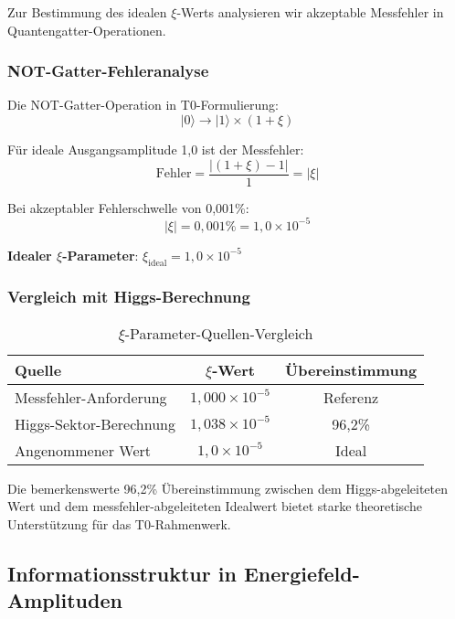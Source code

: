 \documentclass[12pt,a4paper]{article}
\begin{document}
	Zur Bestimmung des idealen $\xi$-Werts analysieren wir akzeptable Messfehler in Quantengatter-Operationen.
	
	\subsubsection{NOT-Gatter-Fehleranalyse}
	
	Die NOT-Gatter-Operation in T0-Formulierung:
	\begin{equation}
		|0\rangle \rightarrow |1\rangle \times (1 + \xi)
	\end{equation}
	
	Für ideale Ausgangsamplitude 1,0 ist der Messfehler:
	\begin{equation}
		\text{Fehler} = \frac{|(1 + \xi) - 1|}{1} = |\xi|
	\end{equation}
	
	Bei akzeptabler Fehlerschwelle von 0,001\%:
	\begin{equation}
		|\xi| = 0,001\% = 1,0 \times 10^{-5}
	\end{equation}
	
	\textbf{Idealer $\xi$-Parameter}: $\xi_{\text{ideal}} = 1,0 \times 10^{-5}$
	
	\subsubsection{Vergleich mit Higgs-Berechnung}
	
	\begin{table}[htbp]
		\centering
		\begin{tabular}{lcc}
			\toprule
			\textbf{Quelle} & \textbf{$\xi$-Wert} & \textbf{Übereinstimmung} \\
			\midrule
			Messfehler-Anforderung & $1,000 \times 10^{-5}$ & Referenz \\
			Higgs-Sektor-Berechnung & $1,038 \times 10^{-5}$ & 96,2\% \\
			Angenommener Wert & $1,0 \times 10^{-5}$ & Ideal \\
			\bottomrule
		\end{tabular}
		\caption{$\xi$-Parameter-Quellen-Vergleich}
	\end{table}
	
	Die bemerkenswerte 96,2\% Übereinstimmung zwischen dem Higgs-abgeleiteten Wert und dem messfehler-abgeleiteten Idealwert bietet starke theoretische Unterstützung für das T0-Rahmenwerk.
	
	\subsection{Informationsstruktur in Energiefeld-Amplituden}
	
\end{document}
